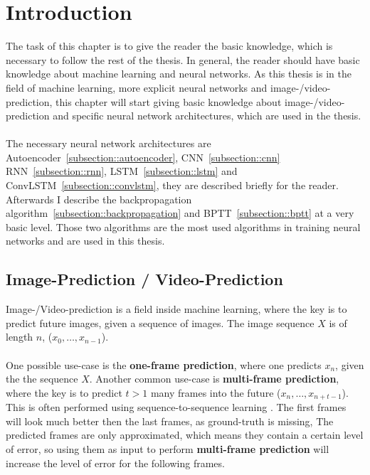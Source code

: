 \section{Introduction} \label{section::introduction}
 The task of this chapter is to give the reader the basic knowledge, which is necessary to follow the rest of the thesis. In general, the reader should have basic 
 knowledge about machine learning and neural networks.
 As this thesis is in the field of machine learning, more explicit neural networks and image-/video-prediction, this chapter will start giving basic knowledge about image-/video-prediction
 and specific neural network architectures, which are used in the thesis.\\\\
 The necessary neural network architectures are Autoencoder~\ref{subsection::autoencoder}, CNN~\ref{subsection::cnn} RNN~\ref{subsection::rnn}, 
 LSTM~\ref{subsection::lstm} and ConvLSTM~\ref{subsection::convlstm}, they are described briefly for the reader.
 Afterwards I describe the backpropagation algorithm~\ref{subsection::backpropagation} and BPTT~\ref{subsection::bptt} at a very basic level.
 Those two algorithms are the most used algorithms in training neural networks and are used in this thesis.

 \subsection{Image-Prediction / Video-Prediction} \label{subsection::imageprediction}
  Image-/Video-prediction is a field inside machine learning, where the key is to predict future images, given a sequence of images. The image sequence $X$ is of 
  length $n$, ($x_0, \ldots, x_{n-1}$).
  \\\\
  One possible use-case is the \textbf{one-frame prediction}, where one predicts $x_n$, given the the sequence $X$. Another common use-case is \textbf{multi-frame prediction}, where the key is to 
  predict $t > 1$ many frames into the future ($x_n, \ldots, x_{n+t-1}$).
  This is often performed using sequence-to-sequence learning \cite{Sutskever2014}. The first frames will look much better then the last frames, as 
  ground-truth is missing, The predicted frames are only approximated, which means they contain a certain level of error, so using them as input to perform \textbf{multi-frame prediction} will
  increase the level of error for the following frames.

